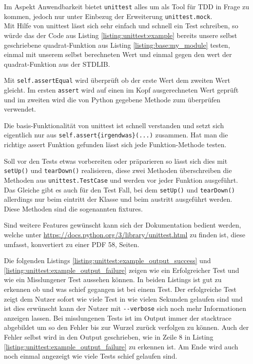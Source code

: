 Im Aspekt Anwendbarkeit bietet \lstinline|unittest| alles um als Tool für TDD in
Frage zu kommen, jedoch nur unter Einbezug der Erweiterung \lstinline|unittest.mock|.
\newline
\\
Mit Hilfe von unittest lässt sich sehr einfach und schnell ein Test schreiben,
so würde das der Code aus Listing \ref{listing:unittest:example} bereits unsere 
selbst geschriebene quadrat-Funktion aus Listing \ref{listing:base:my_module} testen,
einmal mit unserem selbst berechneten Wert und einmal gegen den wert der quadrat-Funktion
aus der STDLIB.

Mit \lstinline{self.assertEqual} wird überprüft ob der erste Wert dem zweiten Wert
gleicht. Im ersten \lstinline{assert} wird auf einen im Kopf ausgerechneten Wert
geprüft und im zweiten wird die von Python gegebene Methode zum überprüfen verwendet.

Die basis-Funktionalität von unittest ist schnell verstanden und setzt sich
eigentlich nur aus \lstinline|self.assert{irgendwas}(...)| zusammen. Hat man die
richtige assert Funktion gefunden lässt sich jede Funktion-Methode testen.

Soll vor den Tests etwas vorbereiten oder präparieren so lässt sich dies mit
\lstinline|setUp()| und \lstinline|tearDown()| realisieren, diese zwei Methoden
überschreiben die Methoden aus \lstinline|unittest.TestCase| und werden vor
jeder Funktion ausgeführt. Das Gleiche gibt es auch für den Test Fall, bei dem
\lstinline|setUp()| und \lstinline|tearDown()| allerdings nur beim eintritt der
Klasse und beim austritt ausgeführt werden. Diese Methoden sind die sogenannten
\Glspl{fixture}.

Sind weitere Features gewünscht kann sich der Dokumentation bedient werden,
welche unter \url{https://docs.python.org/3/library/unittest.html} zu finden
ist, diese umfasst, konvertiert zu einer PDF 58, Seiten.

Die folgenden Listings \ref{listing:unittest:example_output_success} und
\ref{listing:unittest:example_output_failure} zeigen wie ein Erfolgreicher Test
und wie ein Misslungener Test aussehen können.
In beiden Listings ist gut zu erkennen ob und was schief gegangen ist bei einem Test.
Der erfolgreiche Test zeigt dem Nutzer sofort wie viele Test in wie vielen Sekunden gelaufen
sind und ist dies erwünscht kann der Nutzer mit \lstinline|--verbose| sich noch mehr
Informationen anzeigen lassen.
Bei misslungenen Tests ist im Output immer der \gls{stacktrace} abgebildet um so den Fehler
bis zur Wurzel zurück verfolgen zu können. Auch der Fehler selbst wird in den Output geschrieben,
wie in Zeile 8 in Listing \ref{listing:unittest:example_output_failure} zu erkennen ist. Am
Ende wird auch noch einmal angezeigt wie viele Tests schief gelaufen sind.

